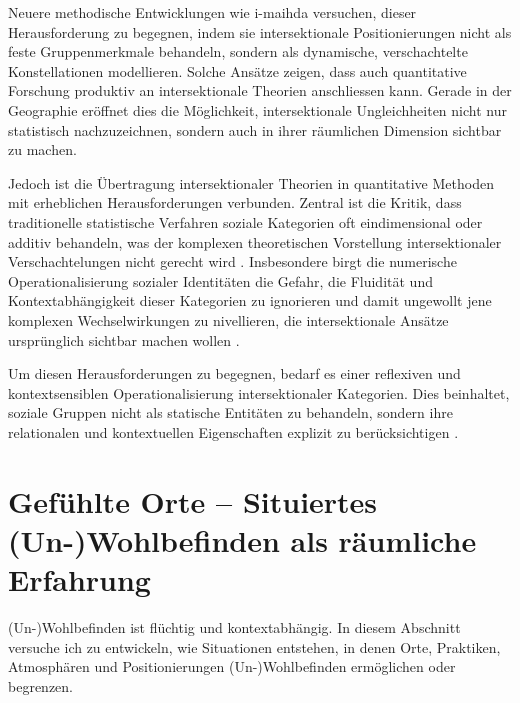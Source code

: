 Neuere methodische Entwicklungen wie \gls{i-maihda} \parencite[\gls{ua}][]{evansMultilevelApproachModeling2018,bellExtendingIntersectionalMultilevel2023} versuchen, dieser Herausforderung zu begegnen, indem sie intersektionale Positionierungen nicht als feste Gruppenmerkmale behandeln, sondern als dynamische, verschachtelte Konstellationen modellieren. Solche Ansätze zeigen, dass auch quantitative Forschung produktiv an intersektionale Theorien anschliessen kann. Gerade in der Geographie eröffnet dies die Möglichkeit, intersektionale Ungleichheiten nicht nur statistisch nachzuzeichnen, sondern auch in ihrer räumlichen Dimension sichtbar zu machen.

Jedoch ist die Übertragung intersektionaler Theorien in quantitative Methoden mit erheblichen Herausforderungen verbunden. Zentral ist die Kritik, dass traditionelle statistische Verfahren soziale Kategorien oft eindimensional oder additiv behandeln, was der komplexen theoretischen Vorstellung intersektionaler Verschachtelungen nicht gerecht wird \parencite{hancockWhenMultiplicationDoesnt2007, bowlegInvitedReflectionQuantifying2016}. Insbesondere birgt die numerische Operationalisierung sozialer Identitäten die Gefahr, die Fluidität und Kontextabhängigkeit dieser Kategorien zu ignorieren und damit ungewollt jene komplexen Wechselwirkungen zu nivellieren, die intersektionale Ansätze ursprünglich sichtbar machen wollen \parencite{scottIntersectionalityQuantitativeMethods2017}.

Um diesen Herausforderungen zu begegnen, bedarf es einer reflexiven und kontextsensiblen Operationalisierung intersektionaler Kategorien. Dies beinhaltet, soziale Gruppen nicht als statische Entitäten zu behandeln, sondern ihre relationalen und kontextuellen Eigenschaften explizit zu berücksichtigen \parencite{rodo-de-zarateDevelopingGeographiesIntersectionality2014, websterCenteringSocialtechnicalRelations2021}.


\section{Gefühlte Orte -- Situiertes (Un-)Wohlbefinden als räumliche Erfahrung}

(Un\nobreakdash-)Wohl\-be\-find\-en ist flüchtig und kontextabhängig. In diesem Abschnitt versuche ich zu entwickeln, wie Situationen entstehen, in denen Orte, Praktiken, Atmosphären und Positionierungen (Un\nobreakdash-)Wohl\-be\-find\-en ermöglichen oder begrenzen.


